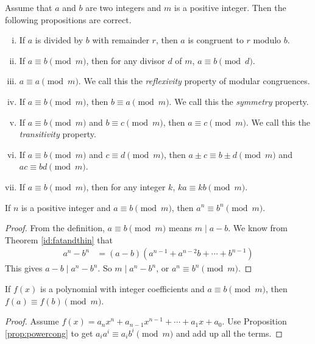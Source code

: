 \documentclass{subfile}
\begin{document}
	\begin{proposition}
		Assume that $a$ and $b$ are two integers and $m$ is a positive integer. Then the following propositions are correct.
			\begin{enumerate}[i.]
				\item If $a$ is divided by $b$ with remainder $r$, then $a$ is congruent to $r$ modulo $b$.
				\item If $a\equiv b\pmod m$, then for any divisor $d$ of $m$, $a\equiv b\pmod d$.
				\item $a \equiv a \pmod m$. We call this the \textit{reflexivity} property of modular congruences.
				\item If $a \equiv b \pmod m$, then $b \equiv a \pmod m$. We call this the \textit{symmetry} property.
				\item If $a \equiv b \pmod m$ and $b \equiv c \pmod m$, then $a \equiv c \pmod m$. We call this the \textit{transitivity} property.
				\item If $a \equiv b \pmod m$ and $c \equiv d \pmod m$, then $a\pm c \equiv b \pm d \pmod m$ and $ac \equiv bd \pmod m$.
				\item If $a \equiv b \pmod m$, then for any integer $k$, $ka \equiv kb \pmod m$.
			\end{enumerate}
	\end{proposition}

	\begin{proposition}\label{prop:powercong}
		If $n$ is a positive integer and $a \equiv b \pmod m$, then $a^n \equiv b^n \pmod m$.
	\end{proposition}

	\begin{proof}
		From the definition, $a \equiv b \pmod m$ means $m\mid a-b$. We know from Theorem \ref{id:fatandthin} that
		\begin{align*}
			a^n-b^n & = (a-b)\left(a^{n-1}+a^{n-2}b+\cdots+b^{n-1}\right)
		\end{align*}
		This gives $a-b\mid a^n-b^n$. So $m\mid a^n - b^n$, or $a^n \equiv b^n \pmod m$.
	\end{proof}

	\begin{proposition}
		If $f(x)$ is a polynomial with integer coefficients and $a \equiv b \pmod m$, then $f(a) \equiv f(b) \pmod m$.
	\end{proposition}

	\begin{proof}
		Assume $f(x)=a_n x^n + a_{n-1} x^{n-1} + \cdots + a_1 x + a_0$. Use Proposition \eqref{prop:powercong} to get $a_i a^i \equiv a_i b^i \pmod m$ and add up all the terms.
	\end{proof}
\end{document}
